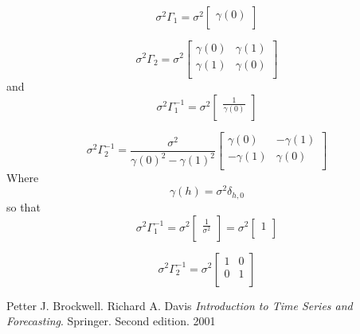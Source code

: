 \documentclass[11pt, oneside]{article}   	%
\begin{document}
\begin{equation}
   \sigma^{2}\Gamma_{1}=
  \sigma^{2} \left[ {\begin{array}{cc}
   \gamma(0)  \\
  \end{array} } \right]
\end{equation}

\begin{equation}
   \sigma^{2}\Gamma_{2}=
  \sigma^{2} \left[ {\begin{array}{cc}
   \gamma(0) & \gamma(1) \\
   \gamma(1)& \gamma(0) \\
  \end{array} } \right]
\end{equation}
and 
\begin{equation}
   \sigma^{2}\Gamma_{1}^{-1}=
  \sigma^{2} \left[ {\begin{array}{cc}
   \frac{1}{\gamma(0)}  \\
  \end{array} } \right]
\end{equation}

\begin{equation}
   \sigma^{2}\Gamma_{2}^{-1}=
\frac{\sigma^{2}}{\gamma(0)^{2}-\gamma(1)^{2}} \left[ {\begin{array}{cc}
   \gamma(0) & -\gamma(1) \\
   -\gamma(1)& \gamma(0) \\
  \end{array} } \right]
\end{equation}
Where 
\begin{equation}
\gamma(h) = \sigma^{2}\delta_{h,0} 
\end{equation}
so that
\begin{equation}
   \sigma^{2}\Gamma_{1}^{-1}=
  \sigma^{2} \left[ {\begin{array}{cc}
   \frac{1}{\sigma^{2}}  \\
  \end{array} } \right]
  = 
  \sigma^{2} \left[ {\begin{array}{cc}
   1  \\
  \end{array} } \right]
\end{equation}

\begin{equation}
   \sigma^{2}\Gamma_{2}^{-1}=
\sigma^{2} \left[ {\begin{array}{cc}
   1 & 0 \\
   0& 1 \\
  \end{array} } \right]
\end{equation}





\begin{thebibliography}{9}
Petter J. Brockwell. Richard A. Davis
\textit{Introduction to Time Series and Forecasting}. 
Springer. Second edition. 2001
 
\end{thebibliography}
\end{document}
